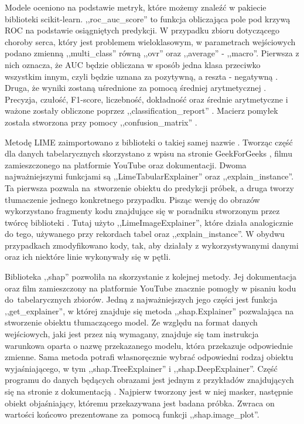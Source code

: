 Modele oceniono na podstawie metryk, które możemy znaleźć w pakiecie biblioteki scikit-learn. ,,roc\_auc\_score'' to funkcja obliczająca pole pod krzywą ROC na podstawie osiągniętych predykcji. W przypadku zbioru dotyczącego choroby serca, który jest problemem wieloklasowym, w parametrach wejściowych podano zmienną ,,multi\_class'' równą ,,ovr'' oraz ,,average'' - ,,macro''. Pierwsza z nich oznacza, że AUC będzie obliczana w sposób jedna klasa przeciwko wszystkim innym, czyli będzie uznana za pozytywną, a reszta - negatywną \cite{roc_ovr_documentation}. Druga, że wyniki zostaną uśrednione za pomocą średniej arytmetycznej \cite{roc_auc_score_documentation}. Precyzja, czułość, F1-score, liczebność, dokładność oraz średnie arytmetyczne i ważone zostały obliczone poprzez ,,classification\_report'' \cite{classification_report_documentation}. Macierz pomyłek została stworzona przy pomocy ,,confusion\_matrix'' \cite{confusion_matrix_documentation}.

Metodę LIME zaimportowano z biblioteki o takiej samej nazwie \cite{lime_documentation}. Tworząc część dla danych tabelarycznych skorzystano z wpisu na stronie GeekForGeeks \cite{lime_tabular_code}, filmu zamieszczonego na platformie YouTube \cite{lime_yt_video} oraz dokumentacji. Dwoma najważniejszymi funkcjami są ,,LimeTabularExplainer'' oraz ,,explain\_instance''. Ta pierwsza pozwala na~stworzenie obiektu do predykcji próbek, a druga tworzy tłumaczenie jednego konkretnego przypadku. Pisząc wersję do obrazów wykorzystano fragmenty kodu znajdujące się w poradniku stworzonym przez twórcę biblioteki \cite{lime_images_code}. Tutaj użyto ,,LimeImageExplainer'', które działa analogicznie do tego, używanego przy rekordach tabel oraz ,,explain\_instance''. W obydwu przypadkach zmodyfikowano kody, tak, aby działały z wykorzystywanymi danymi oraz ich niektóre linie wykonywały się w pętli.

Biblioteka ,,shap'' pozwoliła na skorzystanie z kolejnej metody. Jej dokumentacja \cite{shap_documentation} oraz film zamieszczony na platformie YouTube \cite{shap_yt_video} znacznie pomogły w pisaniu kodu do~tabelarycznych zbiorów. Jedną z najważniejszych jego części jest funkcja ,,get\_explainer'', w której znajduje się metoda ,,shap.Explainer'' pozwalająca na stworzenie obiektu tłumaczącego model. Ze względu na format danych wejściowych, jaki jest przez nią wymagany, znajduje się tam instrukcja warunkowa oparta o nazwę przekazanego modelu, która przekazuje odpowiednie zmienne. Sama metoda potrafi własnoręcznie wybrać odpowiedni rodzaj obiektu wyjaśniającego, w tym ,,shap.TreeExplainer'' i ,,shap.DeepExplainer''. Część programu do danych będących obrazami jest jednym z przykładów znajdujących się na stronie z dokumentacją \cite{shap_image_documentation}. Najpierw tworzony jest w niej masker, następnie obiekt objaśniający, któremu przekazywana jest badana próbka. Zwraca on wartości końcowo prezentowane za~pomocą funkcji ,,shap.image\_plot''.

